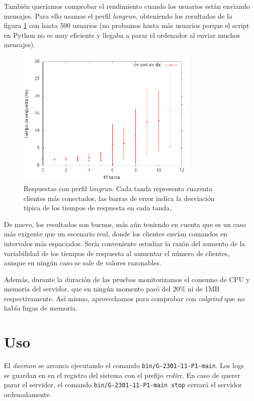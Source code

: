 \documentclass{article}
\begin{document}
También queríamos comprobar el rendimiento cuando los usuarios están enviando mensajes. Para ello usamos el perfil \textit{longrun}, obteniendo los resultados de la figura \ref{imgLongrun} con hasta 500 usuarios (no probamos hasta más usuarios porque el script en Python no es muy eficiente y llegaba a parar el ordenador al enviar muchos mensajes).

\begin{figure}[hbtp]
\centering
\includegraphics[width=0.8\textwidth]{longrun.png}
\caption{Respuestas con perfil \textit{longrun}. Cada tanda representa cuarenta clientes más conectados, las barras de error indica la desviación típica de los tiempos de respuesta en cada tanda.}
\label{imgLongrun}
\end{figure}

De nuevo, los resultados son buenos, más aún teniendo en cuenta que es un caso más exigente que un escenario real, donde los clientes envían comandos en intervalos más espaciados. Sería conveniente estudiar la razón del aumento de la variabilidad de los tiempos de respuesta al aumentar el número de clientes, aunque en ningún caso se sale de valores razonables.

Además, durante la duración de las pruebas monitorizamos el consumo de CPU y memoria del servidor, que en ningún momento pasó del 20\% ni de 1MB respectivamente. Así mismo, aprovechamos para comprobar con \textit{valgrind} que no había fugas de memoria.



\section{Uso}

El \textit{daemon} se arranca ejecutando el comando \texttt{bin/G-2301-11-P1-main}. Los logs se guardan en en el registro del sistema con el prefijo \textit{redirc}. En caso de querer parar el servidor, el comando \texttt{bin/G-2301-11-P1-main stop} cerrará el servidor ordenadamente.
\end{document}
